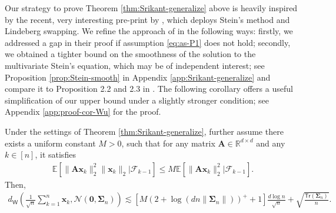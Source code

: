 Our strategy to prove Theorem \ref{thm:Srikant-generalize} above is heavily inspired by the recent, very interesting pre-print by \cite{srikant2024rates}, which deploys Stein's method and Lindeberg swapping. 
We refine the approach of \cite{srikant2024rates} in the following ways: firstly, we addressed a gap in their proof if assumption \eqref{eq:as-P1} does not hold; secondly, we obtained a tighter bound on the smoothness of the solution to the multivariate Stein's equation, which may be of independent interest; see Proposition \ref{prop:Stein-smooth} in Appendix \ref{app:Srikant-generalize}  and compare it to Proposition 2.2 and 2.3 in \cite{gallouët2018regularitysolutionssteinequation}. 
The following corollary offers a useful simplification of our upper bound under a slightly stronger condition; see 
Appendix \ref{app:proof-cor-Wu} for the proof.

\medskip
\begin{customcorollary}
\label{cor:Wu}
Under the settings of Theorem \ref{thm:Srikant-generalize}, further assume there exists a uniform constant $M > 0$, such that for any matrix $\bm{A} \in \mathbb{R}^{d \times d}$ and any $k \in [n]$, it satisfies 
\begin{align}\label{eq:3rd-momentum-condition}
\mathbb{E}\left[\|\bm{Ax}_k\|_2^2 \|\bm{x}_k\|_2 \bigg|\mathscr{F}_{k-1}\right] \leq M \mathbb{E}\left[\|\bm{Ax}_k\|_2^2 \bigg|\mathscr{F}_{k-1}\right].
\end{align}
Then,
\begin{align*}
	d_{\mathsf{W}}\left(\frac{1}{\sqrt{n}}\sum_{k=1}^n \bm{x}_k,\mathcal{N}(\bm{0},\bm{\Sigma}_n)\right) \lesssim \left[M(2+\log(dn\|\bm{\Sigma}_n\|))^+ + 1\right]\frac{d \log n}{\sqrt{n}} +\sqrt{\frac{\mathsf{Tr}(\bm{\Sigma}_n)}{n}}.
\end{align*}
\end{customcorollary}
\medskip

